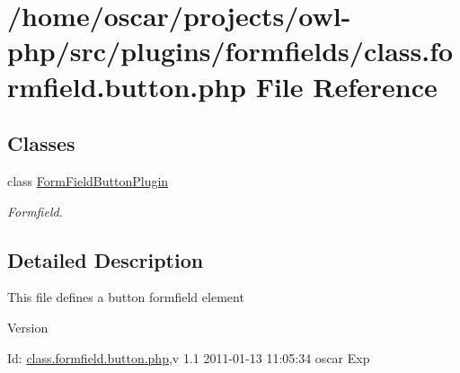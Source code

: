 \section{/home/oscar/projects/owl-\/php/src/plugins/formfields/class.formfield.button.php File Reference}
\label{class_8formfield_8button_8php}
\subsection*{Classes}
\begin{DoxyCompactItemize}
\item 
class \hyperlink{classFormFieldButtonPlugin}{FormFieldButtonPlugin}
\begin{DoxyCompactList}\small\item\em Formfield. \item\end{DoxyCompactList}\end{DoxyCompactItemize}


\subsection{Detailed Description}
This file defines a button formfield element \begin{DoxyVersion}{Version}

\end{DoxyVersion}
\begin{DoxyParagraph}{Id:}
\hyperlink{class_8formfield_8button_8php}{class.formfield.button.php},v 1.1 2011-\/01-\/13 11:05:34 oscar Exp 
\end{DoxyParagraph}
